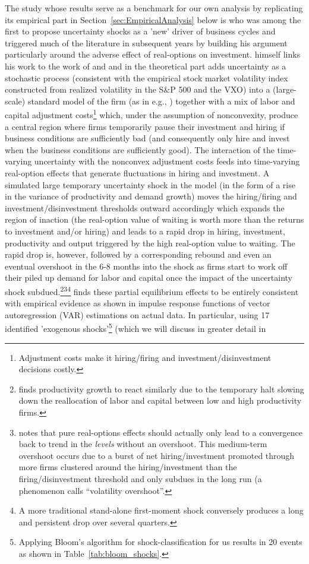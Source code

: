 \documentclass[a4paper,11pt,listof=nochaptergap,oneside,pointednumbers,bibtotoc,bigheadings,liststotoc]{scrbook}
\theoremstyle{mysatz}
\theoremstyle{mydefinition}
\theoremstyle{mybemerkung}
\begin{document}
The study whose results serve as a benchmark for our own analysis by replicating its empirical part in Section~\ref{sec:EmpiricalAnalysis} below is \citet{bloom:09} who was among the first to propose uncertainty shocks as a 'new' driver of business cycles and triggered much of the literature in subsequent years by building his argument particularly around the adverse effect of real-options on investment. \citet{bloom:09} himself links his work to the work of \citet{bernanke:83} and \citet{hassler:96} and in the theoretical part adds uncertainty as a stochastic process (consistent with the empirical stock market volatility index constructed from realized volatility in the S\&P 500 and the VXO) into a (large-scale) standard model of the firm (as in e.g., \citealp{abelandeberly:96}) together with a mix of labor and capital adjustment costs\footnote{Adjustment costs make it hiring/firing and investment/disinvestment decisions costly.} which, under the assumption of nonconvexity, produce a central region where firms temporarily pause their investment and hiring if business conditions are sufficiently bad (and consequently only hire and invest when the business conditions are sufficiently good). The interaction of the time-varying uncertainty with the nonconvex adjustment costs feeds into time-varying real-option effects that generate fluctuations in hiring and investment. A simulated large temporary uncertainty shock in the model (in the form of a rise in the variance of productivity and demand growth) moves the hiring/firing and investment/disinvestment thresholds outward accordingly which expands the region of inaction (the real-option value of waiting is worth more than the returns to investment and/or hiring) and leads to a rapid drop in hiring, investment, productivity and output triggered by the high real-option value to waiting. The rapid drop is, however, followed by a corresponding rebound and even an eventual overshoot in the 6-8 months into the shock as firms start to work off their piled up demand for labor and capital once the impact of the uncertainty shock subdued.\footnote{\citet{bloom:09} finds productivity growth to react similarly due to the temporary halt slowing down the reallocation of labor and capital between low and high productivity firms.}\footnote{\citet[p. 646]{bloom:09} notes that pure real-options effects should actually only lead to a convergence back to trend in the \textit{levels} without an overshoot. This medium-term overshoot occurs due to a burst of net hiring/investment promoted through more firms clustered around the hiring/investment than the firing/disinvestment threshold and only subdues in the long run (a phenomenon \citet{bloom:09} calls ``volatility overshoot''.}\footnote{A more traditional stand-alone first-moment shock conversely produces a long and persistent drop over several quarters.} \citet{bloom:09} finds these partial equilibrium effects to be entirely consistent with empirical evidence as shown in impulse response functions of vector autoregression (VAR) estimations on actual data. In particular, using 17 identified 'exogenous shocks'\footnote{Applying Bloom's algorithm for shock-classification for us results in 20 events as shown in Table~\ref{tab:bloom_shocks}.} (which we will discuss in greater detail in 
\end{document}
